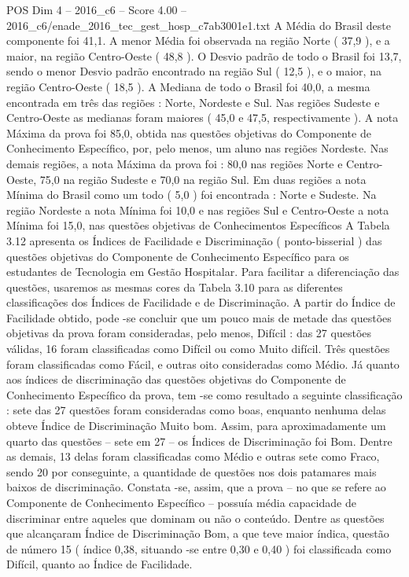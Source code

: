 \begin{textsample}{POS Dim 4 – 2016\_c6 – Score 4.00 – 2016\_c6/enade\_2016\_tec\_gest\_hosp\_c7ab3001e1.txt}
A Média do Brasil deste componente foi 41,1.
A menor Média foi observada na região Norte ( 37,9 ), e a maior, na região Centro-Oeste ( 48,8 ).
O Desvio padrão de todo o Brasil foi 13,7, sendo o menor Desvio padrão encontrado na região Sul ( 12,5 ), e o maior, na região Centro-Oeste ( 18,5 ).
A Mediana de todo o Brasil foi 40,0, a mesma encontrada em três das regiões : Norte, Nordeste e Sul.
Nas regiões Sudeste e Centro-Oeste as medianas foram maiores ( 45,0 e 47,5, respectivamente ).
A nota Máxima da prova foi 85,0, obtida nas questões objetivas do Componente de Conhecimento Específico, por, pelo menos, um aluno nas regiões Nordeste.
Nas demais regiões, a nota Máxima da prova foi : 80,0 nas regiões Norte e Centro-Oeste, 75,0 na região Sudeste e 70,0 na região Sul.
Em duas regiões a nota Mínima do Brasil como um todo ( 5,0 ) foi encontrada : Norte e Sudeste.
Na região Nordeste a nota Mínima foi 10,0 e nas regiões Sul e Centro-Oeste a nota Mínima foi 15,0, nas questões objetivas de Conhecimentos Específicos A Tabela 3.12 apresenta os Índices de Facilidade e Discriminação ( ponto-bisserial ) das questões objetivas do Componente de Conhecimento Específico para os estudantes de Tecnologia em Gestão Hospitalar.
Para facilitar a diferenciação das questões, usaremos as mesmas cores da Tabela 3.10 para as diferentes classificações dos Índices de Facilidade e de Discriminação.
A partir do Índice de Facilidade obtido, pode -se concluir que um pouco mais de metade das questões objetivas da prova foram consideradas, pelo menos, Difícil : das 27 questões válidas, 16 foram classificadas como Difícil ou como Muito difícil.
Três questões foram classificadas como Fácil, e outras oito consideradas como Médio.
Já quanto aos índices de discriminação das questões objetivas do Componente de Conhecimento Específico da prova, tem -se como resultado a seguinte classificação : sete das 27 questões foram consideradas como boas, enquanto nenhuma delas obteve Índice de Discriminação Muito bom.
Assim, para aproximadamente um quarto das questões – sete em 27 – os Índices de Discriminação foi Bom.
Dentre as demais, 13 delas foram classificadas como Médio e outras sete como Fraco, sendo 20 por conseguinte, a quantidade de questões nos dois patamares mais baixos de discriminação.
Constata -se, assim, que a prova – no que se refere ao Componente de Conhecimento Específico – possuía média capacidade de discriminar entre aqueles que dominam ou não o conteúdo.
Dentre as questões que alcançaram Índice de Discriminação Bom, a que teve maior índica, questão de número 15 ( índice 0,38, situando -se entre 0,30 e 0,40 ) foi classificada como Difícil, quanto ao Índice de Facilidade.

\end{textsample}
